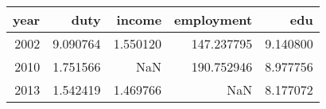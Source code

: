 \begin{tabular}{rrrrr}
\toprule
 year &      duty &    income &  employment &       edu \\
\midrule
 2002 &  9.090764 &  1.550120 &  147.237795 &  9.140800 \\
 2010 &  1.751566 &       NaN &  190.752946 &  8.977756 \\
 2013 &  1.542419 &  1.469766 &         NaN &  8.177072 \\
\bottomrule
\end{tabular}
